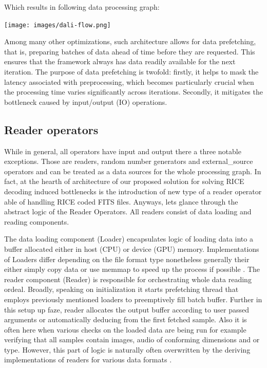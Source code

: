 \documentclass[licencjacka,en]{pracamgr}
\begin{document}
Which  results in following data processing graph: \cite{dali-docs} \\

\centerline{\texttt{[image: images/dali-flow.png]}}

Among many other optimizations, such architecture allows for data prefetching, that is, preparing batches of data ahead of time before they are requested. This ensures that the framework always has data readily available for the next iteration. The purpose of data prefetching is twofold: firstly, it helps to mask the latency associated with preprocessing, which becomes particularly crucial when the processing time varies significantly across iterations. Secondly, it mitigates the bottleneck caused by input/output (IO) operations. \cite{blogpost}

\subsection{Reader operators}

While in general, all operators have input and output there a three notable exceptions. Those are  readers, random number generators and external\_source operators and can be treated as a data sources for the whole processing graph\cite{blogpost}. In fact, at the hearth of architecture of our proposed solution for solving RICE decoding induced bottlenecks is the introduction of new type of a reader operator able of handling RICE coded FITS files. Anyways, lets glance through the abstract logic of the Reader Operators. All readers consist of data loading and reading components.

The data loading component (Loader) encapsulates logic of loading data into a buffer allocated either in host (CPU) or device (GPU) memory. Implementations of Loaders differ depending on the file format type nonetheless generally their either simply copy data or use memmap to speed up the process if possible \cite{dali-readers}.
The reader component (Reader) is responsible for orchestrating whole data reading ordeal. Broadly, speaking on initialization it starts prefetching thread that employs previously mentioned loaders to preemptively fill batch buffer. Further in this setup up faze, reader allocates the output buffer according to user passed arguments or automatically deducing from the first fetched sample.  Also it is often here when various checks on the loaded data are being run for example verifying that all samples contain images, audio of conforming dimensions and or type.  However, this part of logic is naturally often overwritten by the deriving implementations of readers for various data formats \cite{dali-readers}.  
\end{document}
